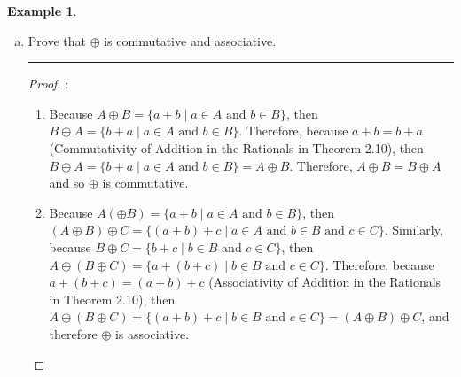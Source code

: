 \documentclass[openany, amssymb, psamsfonts]{amsart}
\theoremstyle{definition}
\newtheorem{exmp}{Example}[section]
\numberwithin{equation}{section}
\begin{document}
\begin{exmp}
\begin{enumerate}[(a)]
\begin{proof}
\begin{enumerate}
    \begin{align*}
        (-a)+q &= b' \in B\\
        a &= a\in A\\
        \tag{Additive Inverse}\;\;\; a+b' &= a+(-a)+q\\
        \tag{FA8:}\;\;\; a+(-a)+q &= 0+q\\
        \tag{Additive ID:}\;\;\; 0+q &= q
    \end{align*}
    Therefore, $q\in A\oplus B$ and 6.1.b is satisfied.
    \item Assume, for the sake of contradiction, that for some $a+b\in A\oplus B$, there does not exist an $r\in A\oplus B$ such that $a+b<r$. Because $A$ has no last point, there must exist some $a'\in A$ such that $a<a'$. By Definition \ref{7.21}, $a+b<a'+b$ for all $b\in B$. Therefore, $a'+b \in A\oplus B$ and so since $a+b<a'+b$, then $a+b$ is not the last point of $A\oplus B$, and so $A\oplus B$ has no last point, satisfying 6.1.c.
\end{enumerate}
Because Definition 6.1 is satisfied, then $A\oplus B$ is a dedekind cut.
\end{proof}
\vspace{4pt}     \hrule   \vspace{4pt}
		\item Prove that $\oplus$ is commutative and associative. 
    \vspace{4pt}     \hrule   \vspace{4pt}
  \begin{proof}:\\
\begin{enumerate}
    \item Because $A\oplus B = \{a + b \mid a \in A\text{ and }b \in B\}$, then $B\oplus A = \{b + a \mid a \in A\text{ and }b \in B\}$. Therefore, because $a+b = b+a$ (Commutativity of Addition in the Rationals in Theorem 2.10), then $B\oplus A = \{b + a \mid a \in A\text{ and }b \in B\} = A\oplus B$. Therefore, $A\oplus B = B\oplus A$ and so $\oplus$ is commutative.  
    \item Because $A(\oplus B) = \{a + b \mid a \in A\text{ and }b \in B\}$, then $(A\oplus B)\oplus C = \{(a + b) + c \mid a \in A\text{ and }b \in B\text{ and }c \in C\}$. Similarly, because $B\oplus C = \{b + c \mid b \in B\text{ and }c \in C\}$, then $A\oplus (B\oplus C) = \{a+ (b + c) \mid b \in B\text{ and }c \in C\}$. Therefore, because $a+(b+c) = (a+b)+c$ (Associativity of Addition in the Rationals in Theorem 2.10), then $A\oplus (B\oplus C) = \{(a+ b) + c \mid b \in B\text{ and }c \in C\} = (A\oplus B)\oplus C$, and therefore $\oplus$ is associative.

\end{enumerate}
\end{proof}
\end{enumerate}
\end{exmp}
\end{document}
